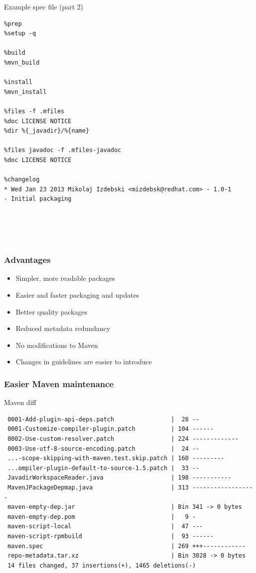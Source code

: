 \documentclass[pdftex,unicode,xcolor=table]{beamer}
\begin{document}
\begin{frame}[fragile]
  \begin{block}{Example spec file (part 2)}
    \scriptsize
\begin{verbatim}
%prep
%setup -q

%build
%mvn_build

%install
%mvn_install

%files -f .mfiles
%doc LICENSE NOTICE
%dir %{_javadir}/%{name}

%files javadoc -f .mfiles-javadoc
%doc LICENSE NOTICE

%changelog
* Wed Jan 23 2013 Mikolaj Izdebski <mizdebsk@redhat.com> - 1.0-1
- Initial packaging





\end{verbatim}
  \end{block}
\end{frame}

\begin{frame}
  \frametitle{Advantages}
  \begin{itemize}
    \item Simpler, more readable packages
    \item Easier and faster packaging and updates
    \item Better quality packages
    \item Reduced metadata redundancy
    \item No modifications to Maven
    \item Changes in guidelines are easier to introduce
  \end{itemize}
\end{frame}

\begin{frame}[fragile]
  \frametitle{Easier Maven maintenance}
  \begin{block}{Maven diff}
    \scriptsize
\begin{verbatim}
 0001-Add-plugin-api-deps.patch                |  28 --
 0001-Customize-compiler-plugin.patch          | 104 ------
 0002-Use-custom-resolver.patch                | 224 -------------
 0003-Use-utf-8-source-encoding.patch          |  24 --
 ...-scope-skipping-with-maven.test.skip.patch | 160 ---------
 ...ompiler-plugin-default-to-source-1.5.patch |  33 --
 JavadirWorkspaceReader.java                   | 198 -----------
 MavenJPackageDepmap.java                      | 313 ------------------
 maven-empty-dep.jar                           | Bin 341 -> 0 bytes
 maven-empty-dep.pom                           |   9 -
 maven-script-local                            |  47 ---
 maven-script-rpmbuild                         |  93 ------
 maven.spec                                    | 269 +++------------
 repo-metadata.tar.xz                          | Bin 3028 -> 0 bytes
 14 files changed, 37 insertions(+), 1465 deletions(-)
\end{verbatim}
  \end{block}
\end{frame}
\end{document}
